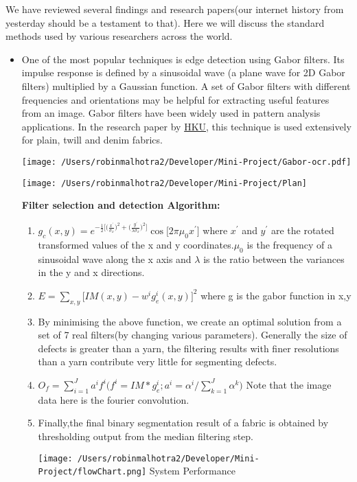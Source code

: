 \documentclass[]{article}
\begin{document}
We have reviewed several findings and research papers(our internet history from yesterday should be a testament to that). Here we will discuss the standard methods used by various researchers across the world.
\begin{itemize}
\item One of the most popular techniques is edge detection using Gabor filters. Its impulse response is defined by a sinusoidal wave (a plane wave for 2D Gabor filters) multiplied by a Gaussian function. A set of Gabor filters with different frequencies and orientations may be helpful for extracting useful features from an image. Gabor filters have been widely used in pattern analysis applications. In the research paper by \href{http://hub.hku.hk/bitstream/10722/46561/1/131190.pdf}{HKU}, this technique is used extensively for plain, twill and denim fabrics.  
\begin{center}
\texttt{[image: /Users/robinmalhotra2/Developer/Mini-Project/Gabor-ocr.pdf]}

\texttt{[image: /Users/robinmalhotra2/Developer/Mini-Project/Plan]}



\end{center}
\textbf{Filter selection and detection Algorithm:}
\begin{enumerate}
\item $g_c(x,y)=e^{-\frac{1}{2} \big[ \big(\frac{ x^{'}}{\sigma_x} \big)^2 +  \big(\frac{ y^{'}}{\lambda \sigma_x} \big)^2 \big]} \cos \big[2\pi \mu_0 x^{'}\big]$
where   $x^{'}$ and  $y^{'}$ are the rotated transformed values of the x and y coordinates.$ \mu_0$ is the frequency of a sinusoidal wave along the x axis and $\lambda$ is the ratio between the variances in the y and x directions.
\item $E=\sum_{x,y}\big[ IM(x,y)-w^{i}g_{e}^{i}(x,y) \big]^{2}$
where g is the gabor function in x,y 
 \item By minimising the above function, we create an optimal solution from a set of 7 real filters(by changing various parameters). Generally the size of defects is greater than a yarn, the filtering results with finer resolutions than a yarn contribute very little for segmenting defects.
\item $O_f=\sum_{i=1}^{J} a^i f^i \big( f^i= IM*g_e^i ; a^i=\alpha^i / \sum_{k=1}^{J} \alpha^k \big)$
Note that the image data here is the fourier convolution.
\item Finally,the final binary segmentation result of a fabric is obtained by thresholding output from  the median filtering step.
\begin{center}
 \texttt{[image: /Users/robinmalhotra2/Developer/Mini-Project/flowChart.png]}
System Performance
\end{center}
\end{enumerate}


\end{itemize}
\end{document}
